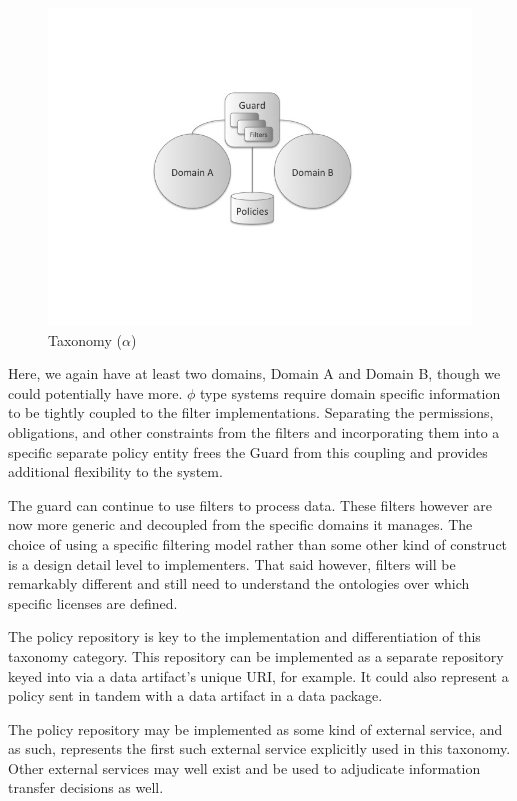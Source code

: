\documentclass[12pt,letterpaper]{article}
\begin{document}
\begin{figure}[!t]
\centering
\includegraphics[width=5in]{model-alpha}
\caption{Taxonomy ($\alpha$)}
\label{fig:model:taxonomy-alpha}
\end{figure}

Here, we again have at least two domains, Domain A and Domain B, though we could potentially have more.  $\phi$ type systems require domain specific information to be tightly coupled to the filter implementations.  Separating the permissions, obligations, and other constraints from the filters and incorporating them into a specific separate policy entity frees the Guard from this coupling and provides additional flexibility to the system.

The guard can continue to use filters to process data.  These filters however are now more generic and decoupled from the specific domains it manages.  The choice of using a specific filtering model rather than some other kind of construct is a design detail level to implementers.  That said however, filters will be remarkably different and still need to understand the ontologies over which specific licenses are defined.

The policy repository is key to the implementation and differentiation of this taxonomy category.  This repository can be implemented as a separate repository keyed into via a data artifact's unique URI, for example.  It could also represent a policy sent in tandem with a data artifact in a data package.

The policy repository may be implemented as some kind of external service, and as such, represents the first such external service explicitly used in this taxonomy.  Other external services may well exist and be used to adjudicate information transfer decisions as well.
\end{document}
